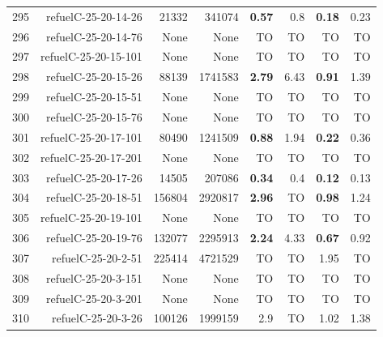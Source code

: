 \begin{longtable}{lrr@{\hskip 12pt}r@{\hskip 12pt}r@{\hskip 12pt}r@{\hskip 12pt}r@{\hskip 12pt}r}
295 & \multirow{1}{*}{refuelC-25-20-14-26} & \multirow{1}{*}{21332} & \multirow{1}{*}{341074} & \textbf{0.57} & 0.8 & \textbf{0.18} & 0.23 \\
296 & \multirow{1}{*}{refuelC-25-20-14-76} & \multirow{1}{*}{None} & \multirow{1}{*}{None} & TO & TO & TO & TO \\
297 & \multirow{1}{*}{refuelC-25-20-15-101} & \multirow{1}{*}{None} & \multirow{1}{*}{None} & TO & TO & TO & TO \\
298 & \multirow{1}{*}{refuelC-25-20-15-26} & \multirow{1}{*}{88139} & \multirow{1}{*}{1741583} & \textbf{2.79} & 6.43 & \textbf{0.91} & 1.39 \\
299 & \multirow{1}{*}{refuelC-25-20-15-51} & \multirow{1}{*}{None} & \multirow{1}{*}{None} & TO & TO & TO & TO \\
300 & \multirow{1}{*}{refuelC-25-20-15-76} & \multirow{1}{*}{None} & \multirow{1}{*}{None} & TO & TO & TO & TO \\
301 & \multirow{1}{*}{refuelC-25-20-17-101} & \multirow{1}{*}{80490} & \multirow{1}{*}{1241509} & \textbf{0.88} & 1.94 & \textbf{0.22} & 0.36 \\
302 & \multirow{1}{*}{refuelC-25-20-17-201} & \multirow{1}{*}{None} & \multirow{1}{*}{None} & TO & TO & TO & TO \\
303 & \multirow{1}{*}{refuelC-25-20-17-26} & \multirow{1}{*}{14505} & \multirow{1}{*}{207086} & \textbf{0.34} & 0.4 & \textbf{0.12} & 0.13 \\
304 & \multirow{1}{*}{refuelC-25-20-18-51} & \multirow{1}{*}{156804} & \multirow{1}{*}{2920817} & \textbf{2.96} & TO & \textbf{0.98} & 1.24 \\
305 & \multirow{1}{*}{refuelC-25-20-19-101} & \multirow{1}{*}{None} & \multirow{1}{*}{None} & TO & TO & TO & TO \\
306 & \multirow{1}{*}{refuelC-25-20-19-76} & \multirow{1}{*}{132077} & \multirow{1}{*}{2295913} & \textbf{2.24} & 4.33 & \textbf{0.67} & 0.92 \\
307 & \multirow{1}{*}{refuelC-25-20-2-51} & \multirow{1}{*}{225414} & \multirow{1}{*}{4721529} & TO & TO & 1.95 & TO \\
308 & \multirow{1}{*}{refuelC-25-20-3-151} & \multirow{1}{*}{None} & \multirow{1}{*}{None} & TO & TO & TO & TO \\
309 & \multirow{1}{*}{refuelC-25-20-3-201} & \multirow{1}{*}{None} & \multirow{1}{*}{None} & TO & TO & TO & TO \\
310 & \multirow{1}{*}{refuelC-25-20-3-26} & \multirow{1}{*}{100126} & \multirow{1}{*}{1999159} & 2.9 & TO & 1.02 & 1.38 \\

\end{longtable}
